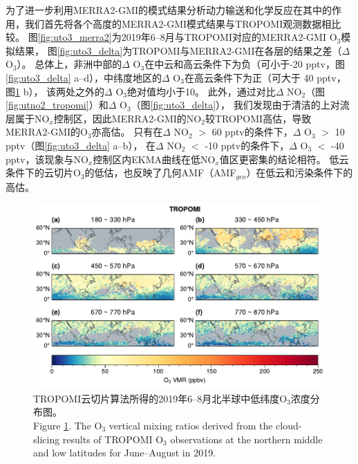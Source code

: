 为了进一步利用MERRA2-GMI的模式结果分析动力输送和化学反应在其中的作用，我们首先将各个高度的MERRA2-GMI模式结果与TROPOMI观测数据相比较。
图\ref{fig:uto3_merra2}为2019年6--8月与TROPOMI对应的MERRA2-GMI O$_3$模拟结果，
图\ref{fig:uto3_delta}为TROPOMI与MERRA2-GMI在各层的结果之差（$\Delta$ O$_3$）。
总体上，非洲中部的$\Delta$ O$_3$在中云和高云条件下为负（可小于-20 pptv，图\ref{fig:uto3_delta} a--d），中纬度地区的$\Delta$ O$_3$在高云条件下为正（可大于 40 pptv，图\ref{fig:uto3_tropomi} b），
该两处之外的$\Delta$ O$_3$绝对值均小于10。
此外，通过对比$\Delta$ NO$_2$（图\ref{fig:utno2_tropomi}）和$\Delta$ O$_3$（图\ref{fig:uto3_delta}），
我们发现由于清洁的上对流层属于NO$_x$控制区\citep{Brown.2022}，因此MERRA2-GMI的NO$_2$较TROPOMI高估，导致MERRA2-GMI的O$_3$亦高估。
只有在$\Delta$ NO$_2$ $>$ 60 pptv的条件下，$\Delta$ O$_3$ $>$ 10 pptv（图\ref{fig:uto3_delta} a--b），
在$\Delta$ NO$_2$ $<$ -10 pptv的条件下，$\Delta$ O$_3$ $<$ -40 pptv，该现象与NO$_x$控制区内EKMA曲线在低NO$_x$值区更密集的结论相符。
低云条件下的云切片O$_3$的低估，也反映了几何AMF（AMF$_{geo}$）在低云和污染条件下的高估\citep{BelmonteRivas.2015}。

\begin{figure}[!htbp]
    \centering
    \includegraphics[width=15cm]{./figures/uto3_tropomi.pdf}
    \caption{
    TROPOMI云切片算法所得的2019年6--8月北半球中低纬度O$_3$浓度分布图。 \\
    Figure \ref{fig:uto3_tropomi}. The O$_3$ vertical mixing ratios derived from the cloud-slicing results of TROPOMI O$_3$ observations at the northern middle and low latitudes for June--August in 2019.
    }
    \label{fig:uto3_tropomi}
\end{figure}


